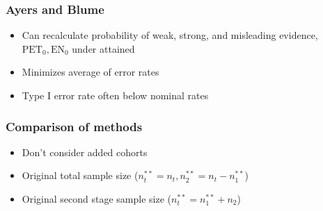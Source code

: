 \documentclass{beamer}\usepackage[]{graphicx}\usepackage[]{color}
\begin{document}
\begin{frame}
\frametitle{Ayers and Blume}
    \begin{itemize}
        \item Can recalculate probability of weak, strong, and misleading evidence, $\mbox{PET}_0, \mbox{EN}_0$  under attained
        \item Minimizes average of error rates
        \item Type I error rate often below nominal rates %
    \end{itemize}
\end{frame}

\begin{frame}
\frametitle{Comparison of methods}
    \begin{itemize}
        \item Don't consider added cohorts
        \item Original total sample size ($n_t^{\ast\ast}=n_t, n_2^{\ast\ast}=n_t-n_1^{\ast\ast}$)
        \item Original second stage sample size ($n_t^{\ast\ast} = n_1^{\ast\ast} + n_2$)
    \end{itemize}
\end{frame} %

\end{document}
